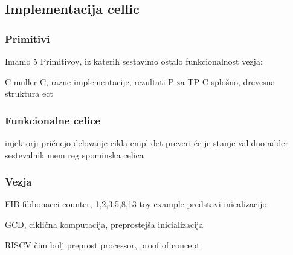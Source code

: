 \subsection{Implementacija cellic} \label{a}
\subsubsection{Primitivi} \label{b}
Imamo 5 Primitivov, iz katerih sestavimo ostalo funkcionalnost vezja:

C muller C, razne implementacije, rezultati
P za TP
C splošno, drevesna struktura
ect


\subsubsection{Funkcionalne celice} \label{b}
injektorji pričnejo delovanje cikla
cmpl det preveri če je stanje validno
adder sestevalnik
mem reg spominska celica


\subsubsection{Vezja} \label{b}
FIB fibbonacci counter, 1,2,3,5,8,13 toy example predstavi inicalizacijo

GCD, ciklična komputacija, preprostejša inicializacija

RISCV čim bolj preprost processor, proof of concept